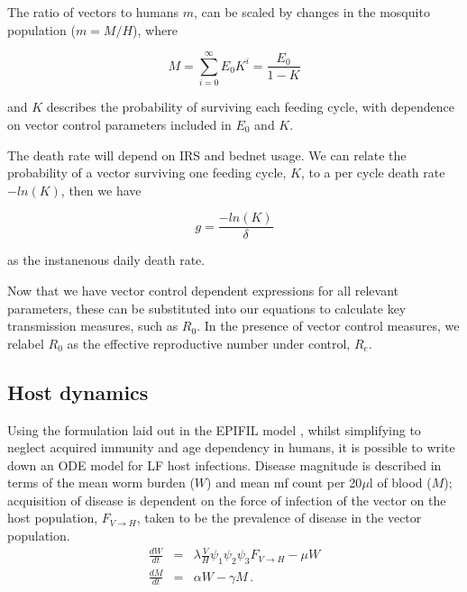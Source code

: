 The ratio of vectors to humans $m$, can be scaled by changes in the mosquito population ($m=M/H$), where

\begin{equation}
M = \sum_{i=0}^{\infty}E_0K^i = \frac{E_0}{1-K}
\end{equation}

and $K$ describes the probability of surviving each feeding cycle, with dependence on vector control parameters included in $E_0$ and $K$.

The death rate will depend on IRS and bednet usage. We can relate the probability of a vector surviving one feeding cycle, $K$, to a per cycle death rate $-ln(K)$, then we have

\begin{equation}
g = \frac{-ln(K)}{\delta}
\end{equation}

as the instanenous daily death rate.

Now that we have vector control dependent expressions for all relevant parameters, these can be substituted into our equations to calculate key transmission measures, such as $R_0$. In the presence of vector control measures, we relabel $R_0$ as the effective reproductive number under control, $R_e$.


\FloatBarrier 

\subsection{Host dynamics}
\label{sec:Host}

Using the formulation laid out in the EPIFIL model \cite{Norman2000_epifil}, whilst simplifying to neglect acquired immunity and age dependency in humans, it is possible to write down an ODE model for LF host infections. Disease magnitude is described in terms of the mean worm burden ($W$) and mean mf count per 20$\mu$l of blood ($M$); acquisition of disease is dependent on the force of infection of the vector on the host population, $F_{V\rightarrow H}$, taken to be the prevalence of disease in the vector population.
\begin{eqnarray}
\frac{dW}{dt} &=& \lambda\frac{V}{H}\psi_1\psi_2\psi_3F_{V\rightarrow H} - \mu W\\
\frac{dM}{dt} &=& \alpha W - \gamma M \,.
\end{eqnarray}

